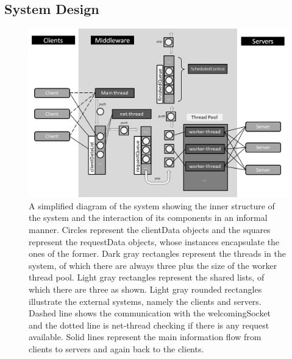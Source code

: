 \documentclass[11pt,a4paper]{article}
\begin{document}
\subsection{System Design} \label{sec:ov-system-design}
\begin{figure}[h]
  \centering
  \includegraphics[width=0.7\linewidth,trim={0px 0px 0px 0px},clip]{img/system-diagram.png}
  \caption{A simplified diagram of the system showing the inner structure of the system and the interaction of its components in an informal manner. Circles represent the clientData objects and the squares represent the requestData objects, whose instances encapsulate the ones of the former. Dark gray rectangles represent the threads in the system, of which there are always three plus the size of the worker thread pool. Light gray rectangles represent the shared lists, of which there are three as shown. Light gray rounded rectangles illustrate the external systems, namely the clients and servers. Dashed line shows the communication with the welcomingSocket and the dotted line is net-thread checking if there is any request available. Solid lines represent the main information flow from clients to servers and again back to the clients.}
  \label{fig:system-diagram}
\end{figure}
\end{document}

